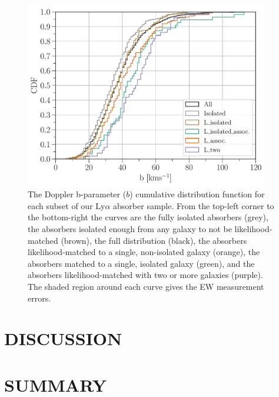 \documentclass[twocolumn,tighten]{aastex62}
\begin{document}
\begin{figure}[ht!]
        \centering
        \vspace{0pt}
        \includegraphics[width=0.95\textwidth]{hist(b)_all6_bins1_6_min_maxEW_0_10000.pdf}
        \caption{\small{The Doppler b-parameter ($b$) cumulative distribution function for each subset of our Ly$\alpha$ absorber sample. From the top-left corner to the bottom-right the curves are the fully isolated absorbers (grey), the absorbers isolated enough from any galaxy to not be likelihood-matched (brown), the full distribution (black), the absorbers likelihood-matched to a single, non-isolated galaxy (orange), the absorbers matched to a single, isolated galaxy (green), and the absorbers likelihood-matched with two or more galaxies (purple). The shaded region around each curve gives the EW measurement errors.}}
        \vspace{-5pt}
        \label{cdf_b}
\end{figure}



\section{DISCUSSION}


\section{SUMMARY}
\end{document}
